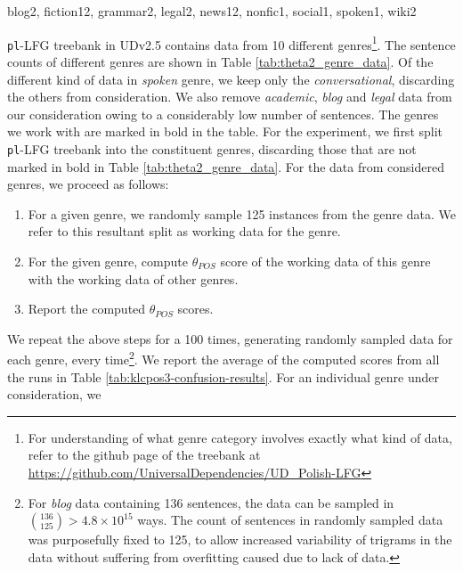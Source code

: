 


blog2, fiction12, grammar2, legal2, news12, nonfic1, social1, spoken1, wiki2

\verb|pl|-LFG treebank in UDv2.5 contains data from 10 different genres\footnote{For understanding of what genre category involves exactly what kind of data, refer to the github page of the treebank at \url{https://github.com/UniversalDependencies/UD_Polish-LFG}}. The sentence counts of different genres are shown in Table \ref{tab:theta2_genre_data}. Of the different kind of data in \textit{spoken} genre, we keep only the \textit{conversational}, discarding the others from consideration. We also remove \textit{academic}, \textit{blog} and \textit{legal} data from our consideration owing to a considerably low number of sentences. The genres we work with are marked in bold in the table. For the experiment, we first split \verb|pl|-LFG treebank into the constituent genres, discarding those that are not marked in bold in Table \ref{tab:theta2_genre_data}. For the data from considered genres, we proceed as follows:

\begin{enumerate}
    \item For a given genre, we randomly sample 125 instances from the genre data. We refer to this resultant split as working data for the genre.
    \item For the given genre, compute \(\theta_{POS}\) score of the working data of this genre with the working data of other genres.
    \item Report the computed \(\theta_{POS}\) scores.
\end{enumerate}

We repeat the above steps for a 100 times, generating randomly sampled data for each genre, every time\footnote{For \textit{blog} data containing 136 sentences, the data can be sampled in \(\genfrac(){0pt}{2}{136}{125} > 4.8 \times 10^{15}\) ways. The count of sentences in randomly sampled data was purposefully fixed to 125, to allow increased variability of trigrams in the data without suffering from overfitting caused due to lack of data.}. We report the average of the computed scores from all the runs in Table \ref{tab:klcpos3-confusion-results}. For an individual genre under consideration, we 

